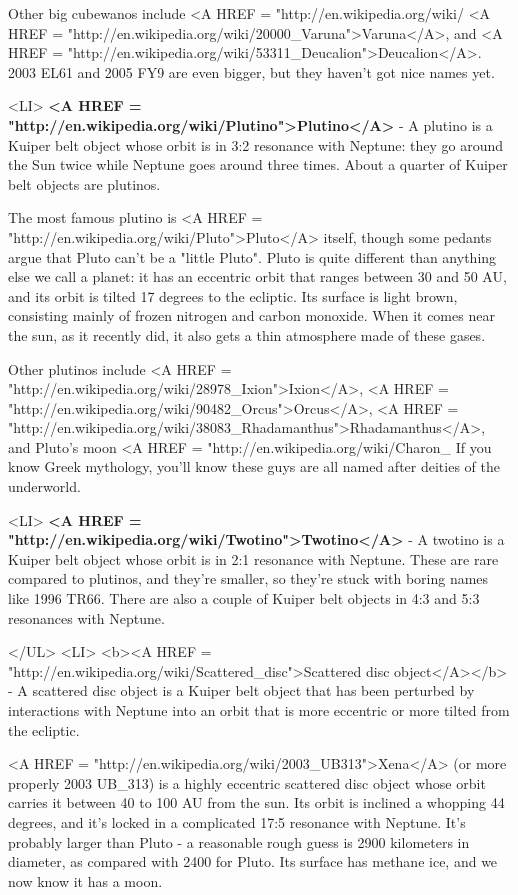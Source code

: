     Other big cubewanos include 
    <A HREF = "http://en.wikipedia.org/wiki/%
    <A HREF = "http://en.wikipedia.org/wiki/20000_Varuna">Varuna</A>, 
   and 
   <A HREF = "http://en.wikipedia.org/wiki/53311_Deucalion">Deucalion</A>.  
    2003 EL61 and 2005 FY9 are even bigger, but they haven't got nice names 
    yet.

<LI>
    \textbf{<A HREF = "http://en.wikipedia.org/wiki/Plutino">Plutino</A>} - A plutino is a Kuiper belt object whose orbit is in 
    3:2 resonance with Neptune: they go around the Sun twice while Neptune
    goes around three times.  About a quarter of Kuiper belt objects 
    are plutinos.  

    The most famous plutino is 
    <A HREF = "http://en.wikipedia.org/wiki/Pluto">Pluto</A> itself, 
    though some pedants argue 
    that Pluto can't be a "little Pluto".  Pluto is quite different 
    than anything else we call a planet: it has an eccentric orbit that 
    ranges between 30 and 50 AU, and its orbit is tilted 17 degrees to
    the ecliptic.  Its surface is light brown, consisting mainly of 
    frozen nitrogen and carbon monoxide.  When it comes near the sun, 
    as it recently did, it also gets a thin atmosphere made of these 
    gases.

    Other plutinos include 
<A HREF = "http://en.wikipedia.org/wiki/28978_Ixion">Ixion</A>, 
<A HREF = "http://en.wikipedia.org/wiki/90482_Orcus">Orcus</A>, 
<A HREF = "http://en.wikipedia.org/wiki/38083_Rhadamanthus">Rhadamanthus</A>, 
and Pluto's moon 
<A HREF = "http://en.wikipedia.org/wiki/Charon_%
If you know Greek mythology, you'll know these guys are all 
    named after deities of the underworld.

<LI>
   \textbf{<A HREF = "http://en.wikipedia.org/wiki/Twotino">Twotino</A>} - 
    A twotino is a Kuiper belt object whose orbit is in 2:1
    resonance with Neptune.  These are rare compared to plutinos, and
    they're smaller, so they're stuck with boring names like 1996 TR66.
    There are also a couple of Kuiper belt objects in 4:3 and 5:3
    resonances with Neptune.

</UL>
<LI>
   <b><A HREF = "http://en.wikipedia.org/wiki/Scattered_disc">Scattered disc 
   object</A></b> - A scattered disc object is a Kuiper belt
   object that has been perturbed by interactions with Neptune into
   an orbit that is more eccentric or more tilted from the ecliptic. 

   <A HREF = "http://en.wikipedia.org/wiki/2003_UB313">Xena</A> 
   (or more properly 2003 UB_{313}) 
   is a highly eccentric scattered 
   disc object whose orbit carries it between 40 to 100 AU from the sun. 
   Its orbit is inclined a whopping 44 degrees, and it's locked in a
   complicated 17:5 resonance with Neptune.  It's probably larger than 
   Pluto - a reasonable rough guess is 2900 kilometers in diameter, as 
   compared with 2400 for Pluto.  Its surface has methane ice, and we 
   now know it has a moon.
 
